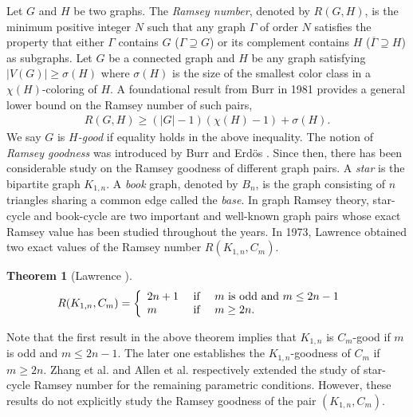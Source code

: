 \documentclass[12pt]{article}
\newtheorem{theorem}{Theorem}
\theoremstyle{definition}
\begin{document}
Let $G$ and $H$ be two graphs. The \emph{Ramsey number}, denoted by $R(G,H)$, is the minimum positive integer $N$ such that any graph $\Gamma$ of order $N$ satisfies the property that either $\Gamma$ contains $G$ ($\Gamma \supseteq G$) or its complement contains $H$ ($\overline{\Gamma}\supseteq H$) as subgraphs. 
Let $G$ be a connected graph and $H$ be any graph satisfying $|V(G)|\geq \sigma(H)$ where $\sigma(H)$ is the size of the smallest color class in a $\chi(H)$-coloring of $H$. A foundational result from Burr \cite{burr1981ramsey} in 1981 provides a general lower bound on the Ramsey number of such pairs,
\begin{align*}
    R(G,H)\geq (|G|-1)(\chi(H)-1)+\sigma(H).
\end{align*}
We say $G$  is \emph{$H$-good} if equality holds in the above inequality. The notion of \emph{Ramsey goodness} was introduced by Burr and Erd\"{o}s \cite{burr1983generalizations}. Since then, there has been considerable study on the Ramsey goodness of different graph pairs. A \emph{star} is the bipartite graph $K_{1,n}$. A \emph{book} graph, denoted by $B_{n}$, is the graph consisting of $n$ triangles sharing a common edge called the \emph{base}. In graph Ramsey theory, star-cycle and book-cycle are two important and well-known graph pairs whose exact Ramsey value has been studied throughout the years. In 1973, Lawrence \cite{SLLawrence1973} obtained two exact values of the Ramsey number $R(K_{1,n},C_m)$. 


\begin{theorem}[Lawrence \cite{SLLawrence1973}] \label{thm: Lawrence}
    \begin{align*}
R(K_{1,n},C_{m})&=\left\{\begin{array}{lll}
		2n+1& \textnormal{ if  }&  m \textnormal{ is odd and } m\leq 2n-1\\
        m &\textnormal{  if }& m\geq 2n.
    \end{array}\right.  
\end{align*}
\end{theorem}

\noindent Note that the first result in the above theorem implies that $K_{1,n}$ is $C_m$-good if $m$ is odd and $m\leq 2n-1$. The later one establishes the $K_{1,n}$-goodness of $C_{m}$ if $m\geq 2n$. Zhang et al.\cite{zhang2016narrowing} and Allen et al.\cite{allen2023ramsey} respectively extended the study of star-cycle Ramsey number for the remaining parametric conditions. However, these results do not explicitly study the Ramsey goodness of the pair $(K_{1,n},C_{m})$.
\end{document}
